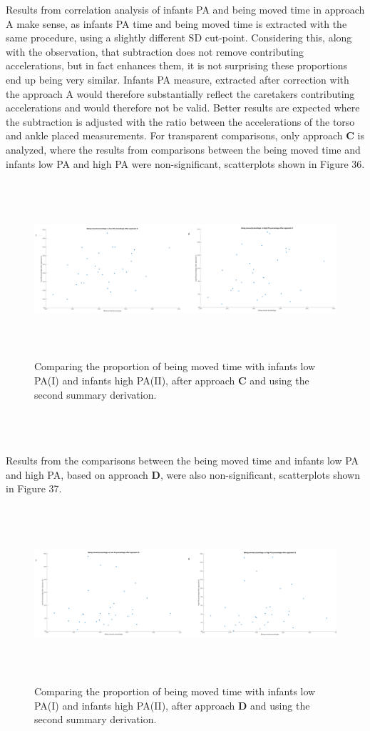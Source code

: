 \documentclass{article}
\begin{document}
{Results from correlation analysis of infants PA and being moved time in approach A make sense, as infants PA time and being moved time is extracted with the same procedure, using a slightly different SD cut-point. Considering this, along with the observation, that subtraction does not remove contributing accelerations, but in fact enhances them, it is not surprising these proportions end up being very similar. Infants PA measure, extracted after correction with the approach A would therefore substantially reflect the caretakers contributing accelerations and would therefore not be valid. Better results are expected where the subtraction is adjusted with the ratio between the accelerations of the torso and ankle placed measurements. For transparent comparisons, only approach \textbf{C} is analyzed, where the results from comparisons between the being moved time and infants low PA and high PA were non-significant, scatterplots shown in Figure 36. 
\newpage
\begin{figure}[h!]
\includegraphics[width=15cm, height=6.5cm]{IBM_vs_PA_C.png}
\caption{Comparing the proportion of being moved time with infants low PA(I) and infants high PA(II), after approach \textbf{C} and using the second summary derivation.}
\end{figure}
\\\\\\
Results from the comparisons between the being moved time and infants low PA and high PA, based on approach \textbf{D}, were also non-significant, scatterplots shown in Figure 37. 
\begin{figure}[h!]
\includegraphics[width=15cm, height=6.5cm]{IBM_vs_PA_D.png}
\caption{Comparing the proportion of being moved time with infants low PA(I) and infants high PA(II), after approach \textbf{D} and using the second summary derivation.}
\end{figure}

}
\end{document}

